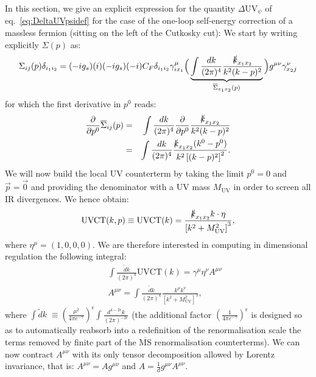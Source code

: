 \documentclass[11pt]{article}
\begin{document}
In this section, we give an explicit expression for the quantity $\Delta \textrm{UV}_{\psi}$ of eq.~\eqref{eq:DeltaUVpsidef} for the case of the one-loop self-energy correction of a massless fermion (sitting on the left of the Cutkosky cut):
We start by writing explicitly $\Sigma(p)$ as:
\begin{equation}
\Sigma_{ij}(p) \delta_{i_1 i_2} = (-i g_s) (i) (-i g_s )(-i ) C_F \delta_{i_1 i_2} \gamma_{i x_1}^\mu {\Big(} 
\underbrace{
\int \frac{d k}{(2\pi)^4} \frac{\slashed{k}_{x_1 x_2}}{k^2 (k-p)^2}
}_{\overline{\Sigma}_{x_1 x_2}(p)}
\Big{)} g^{\mu\nu}\gamma^\nu_{x_2 j}
\end{equation}
for which the first derivative in $p^0$ reads:
\begin{eqnarray}
\frac{\partial}{\partial p^0} \overline{\Sigma}_{ij}(p)
&=&\int \frac{d k}{(2\pi)^4} \frac{\partial}{\partial p^0} \frac{\slashed{k}_{x_1 x_2}}{k^2 (k-p)^2} \nonumber \\
&=& \int \frac{d k}{(2\pi)^4} \frac{ \slashed{k}_{x_1 x_2}(k^0-p^0) }{k^2 \left[(k-p)^2\right]^2}.
\end{eqnarray}
We will now build the local UV counterterm by taking the limit $p^0=0$ and $\vec{p}=\vec{0}$ and providing the denominator with a UV mass $M_\textrm{UV}$ in order to screen all IR divergences. We hence obtain:
\begin{equation}
\textrm{UVCT}(k,p) \equiv \textrm{UVCT}(k) = \frac{ \slashed{k}_{x_1 x_2} k\cdot\eta }{\left[ k^2+M_\textrm{UV}^2\right]^3},
\end{equation}
where $\eta^\mu=(1,0,0,0)$. We are therefore interested in computing in dimensional regulation the following integral:
\begin{eqnarray}
&&\int \frac{\tilde{d} k}{(2\pi)^4} \textrm{UVCT}(k) = \gamma^\mu \eta^\nu A^{\mu\nu} \nonumber\\ 
&&A^{\mu\nu} = \int \frac{\tilde{d} k}{(2\pi)^4} \frac{ k^\mu k^\nu }{\left[ k^2+M_\textrm{UV}^2\right]^3}, \label{Adef}
\end{eqnarray}
where  $\int \tilde{d}k\; \equiv \left(\frac{\mu^2}{4\pi e^{-\gamma}}\right)^{\epsilon} \int \frac{d^{4-2\epsilon}k}{(2\pi)^{-2\epsilon}} $ (the additional factor $ \left(\frac{1}{4\pi e^{-\gamma}}\right)^{\epsilon} $ is designed so as to automatically reabsorb into a redefinition of the renormalisation scale the terms removed by finite part of the $\overline{\textrm{MS}}$ renormalisation counterterms). 
We can now contract $A^{\mu\nu}$ with its only tensor decomposition allowed by Lorentz invariance, that is: $A^{\mu\nu}=A g^{\mu\nu}$ and $A=\frac{1}{d}g^{\mu\nu}A^{\mu\nu}$.
\end{document}
